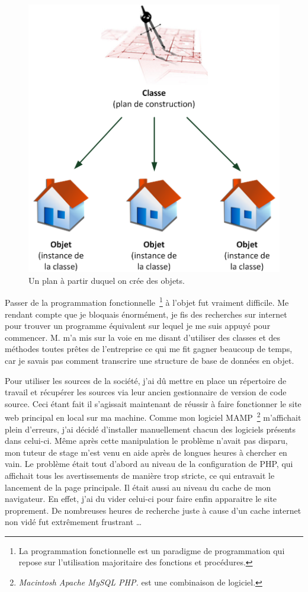 \begin{figure}
\begin{center}
\includegraphics[scale=0.5]{images/objet.png}
\end{center}
\caption{Un plan à partir duquel on crée des objets.}
\label{obj}
\end{figure}

Passer de la programmation fonctionnelle\, \footnote{La programmation
fonctionnelle est un paradigme de programmation qui repose sur l'utilisation
majoritaire des fonctions et procédures.} à l'objet fut vraiment difficile. Me
rendant compte que je bloquais énormément, je fis des recherches sur internet
pour trouver un programme équivalent sur lequel je me suis appuyé pour
commencer. M. m'a mis sur la voie en me disant d'utiliser des
classes et des méthodes toutes prêtes de l'entreprise ce qui me fit gagner
beaucoup de temps, car je savais pas comment transcrire une structure de base
de données en objet.

Pour utiliser les sources de la société, j'ai dû mettre en place un répertoire
de travail et récupérer les sources via leur ancien gestionnaire de version de
code source. Ceci étant fait il s'agissait maintenant de réussir à faire
fonctionner le site web principal en local sur ma machine. Comme mon logiciel
MAMP\, \footnote{\emph{Macintosh Apache MySQL PHP.} est une combinaison de
logiciel.} m'affichait plein d'erreurs, j'ai décidé d'installer manuellement
chacun des logiciels présents dans celui-ci. Même après cette manipulation le
problème n'avait pas disparu, mon tuteur de stage m'est venu en aide après de
longues heures à chercher en vain. Le problème était tout d'abord au niveau de
la configuration de PHP, qui affichait tous les avertissements de manière trop
stricte, ce qui entravait le lancement de la page principale. Il était aussi au
niveau du cache de mon navigateur. En effet, j'ai du vider celui-ci pour faire
enfin apparaitre le site proprement. De nombreuses heures de recherche juste à
cause d'un cache internet non vidé fut extrêmement frustrant \ldots{}

